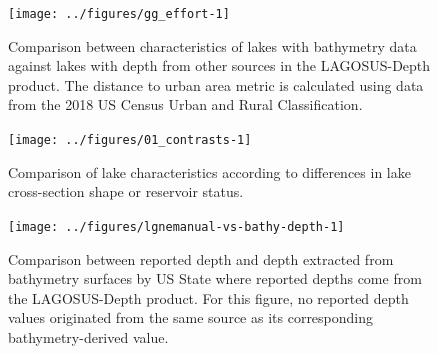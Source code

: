 \documentclass[draft,wrr]{agutexSI2019}
\begin{document}

\begin{figure}
      \begin{center}\texttt{[image: ../figures/gg\_effort-1]}\end{center}
      \caption{Comparison between characteristics of lakes with bathymetry data against lakes with depth from other sources in the LAGOSUS-Depth product. The distance to urban area metric is calculated using data from the 2018 US Census Urban and Rural Classification.}\label{figS8}
\end{figure}

\clearpage
\begin{figure}
      \begin{center}\texttt{[image: ../figures/01\_contrasts-1]}\end{center}
      \caption{Comparison of lake characteristics according to differences in lake cross-section shape or reservoir status.}\label{figS9}
\end{figure}

\clearpage

\begin{figure}
      \begin{center}\texttt{[image: ../figures/lgnemanual-vs-bathy-depth-1]}\end{center}
      \caption{Comparison between reported depth and depth extracted from bathymetry surfaces by US State where reported depths come from the LAGOSUS-Depth product. For this figure, no reported depth values originated from the same source as its corresponding bathymetry-derived value.}\label{figS10}
\end{figure}

\clearpage
\end{document}

